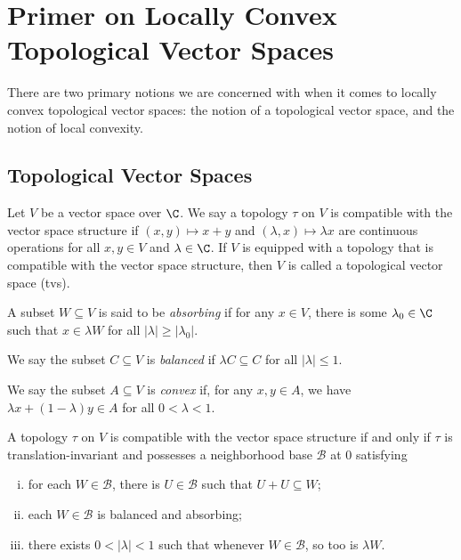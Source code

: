 \documentclass[10pt]{mypackage}
\begin{document}
\RaggedRight
\section{Primer on Locally Convex Topological Vector Spaces}%
There are two primary notions we are concerned with when it comes to locally convex topological vector spaces: the notion of a topological vector space, and the notion of local convexity. 
\subsection{Topological Vector Spaces}%
\begin{definition}
  Let $V$ be a vector space over $\C$. We say a topology $\tau$ on $V$ is compatible with the vector space structure if $\left( x,y \right) \mapsto x + y$ and $\left( \lambda,x \right)\mapsto \lambda x$ are continuous operations for all $x,y\in V$ and $\lambda\in \C$. If $V$ is equipped with a topology that is compatible with the vector space structure, then $V$ is called a topological vector space (tvs).
\end{definition}
\begin{definition}
  A subset $W\subseteq V$ is said to be \textit{absorbing} if for any $x\in V$, there is some $\lambda_0\in \C$ such that $x\in \lambda W$ for all $ \left\vert \lambda \right\vert\geq \left\vert \lambda_0 \right\vert $.

  We say the subset $C\subseteq V$ is \textit{balanced} if $\lambda C \subseteq C$ for all $\left\vert \lambda \right\vert\leq 1$.

  We say the subset $A\subseteq V$ is \textit{convex} if, for any $x,y\in A$, we have $\lambda x + \left( 1-\lambda \right) y\in A$ for all $0 < \lambda < 1$.
\end{definition}
\begin{proposition}
  A topology $\tau$ on $V$ is compatible with the vector space structure if and only if $\tau$ is translation-invariant and possesses a neighborhood base $\mathcal{B}$ at $0$ satisfying
  \begin{enumerate}[(i)]
    \item for each $W\in \mathcal{B}$, there is $U\in \mathcal{B}$ such that $U + U \subseteq W$;
    \item each $W\in \mathcal{B}$ is balanced and absorbing;
    \item there exists $0 < \left\vert \lambda \right\vert < 1$ such that whenever $W\in \mathcal{B}$, so too is $ \lambda W $.
  \end{enumerate}
\end{proposition}
\end{document}
